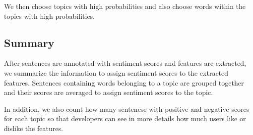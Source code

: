 We then choose topics with high probabilities and also choose words within the topics with high probabilities.


\subsection{Summary}
After sentences are annotated with sentiment scores and features are extracted, we summarize the information to assign sentiment scores to the extracted features. Sentences containing words belonging to a topic are grouped together and their scores are averaged to assign sentiment scores to the topic. 

In addition, we also count how many sentencse with positive and negative scores for each topic so that developers can see in more details how much users like or dislike the features. 





